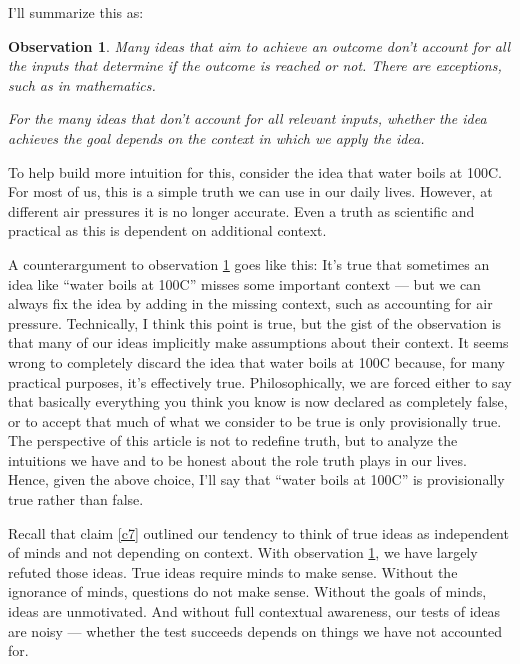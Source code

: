 \documentclass[11pt, oneside]{article}   	%
\newtheorem{obs}{Observation}
\begin{document}

I'll summarize this as:
\begin{obs}\label{o6}
    Many ideas that aim to achieve an outcome don't account for all the inputs
    that determine if the outcome is reached or not. There are exceptions, such
    as in mathematics.

    For the many ideas that don't account for all relevant inputs, whether the
    idea achieves the goal depends on the context in which we apply the idea.
\end{obs}

To help build more intuition for this, consider the idea that water boils at
100\degree C. For most of us, this is a simple truth we can use in our daily
lives. However, at different air pressures it is no longer accurate. Even a
truth as scientific and practical as this is dependent on additional context.

A counterargument to observation \ref{o6} goes like this:
It's true that sometimes an idea like ``water boils at 100\degree C'' misses
some important context --- but we can always fix the idea by adding in the
missing context, such as accounting for air pressure.
Technically, I think this point is true, but the gist of the observation is that
many of our ideas implicitly make assumptions about their context. It seems
wrong to completely discard the idea that water boils at 100\degree C because,
for many practical purposes, it's effectively true. Philosophically, we are
forced either to say that
basically everything you think you know is now
declared as completely false, or to accept that much of what we consider to be
true is only provisionally true.
The perspective of this article is not to redefine truth, but to analyze the
intuitions we have and to be honest about the role truth plays in our lives.
Hence, given the above choice, I'll say that ``water boils at 100\degree C'' is
provisionally true rather than false.

Recall that claim \ref{c7} outlined our tendency to think of true ideas as
independent of minds and not depending on context. With observation \ref{o6}, we
have largely refuted those ideas.
True ideas require minds to make sense.
Without the ignorance of minds, questions do not make sense.
Without the goals of minds, ideas are unmotivated.
And without full contextual awareness, our tests of ideas are noisy ---
whether the test succeeds depends on things we have not accounted
for.
\end{document}

